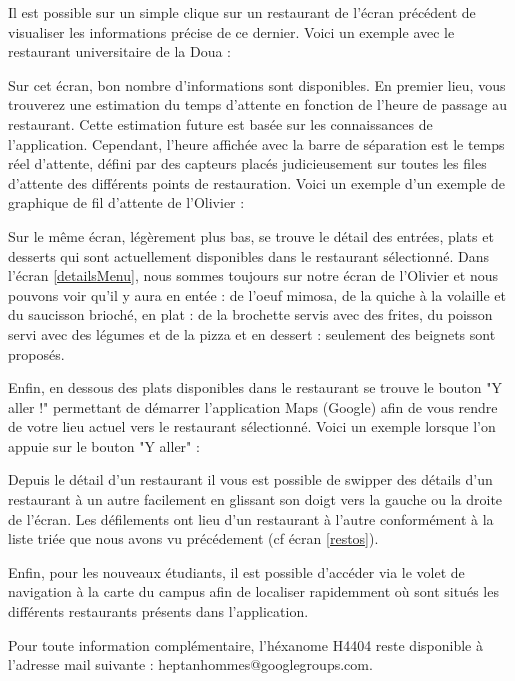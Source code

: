 Il est possible sur un simple clique sur un restaurant de l’écran précédent de
visualiser les informations précise de ce dernier. Voici un exemple avec le
restaurant universitaire de la Doua : 

Sur cet écran, bon nombre d’informations sont disponibles. En premier lieu,
vous trouverez une estimation du temps d’attente en fonction de l’heure de
passage au restaurant. Cette estimation future est basée sur les connaissances
de l’application. Cependant, l’heure affichée avec la barre de séparation est le
temps réel d’attente, défini par des capteurs placés judicieusement sur toutes
les files d’attente des différents points de restauration. Voici un exemple d'un
exemple de graphique de fil d'attente de l'Olivier :

Sur le même écran, légèrement plus bas, se trouve le détail des entrées,
plats et desserts qui sont actuellement disponibles dans le restaurant
sélectionné. Dans l’écran \ref{detailsMenu}, nous sommes toujours sur
notre écran de l'Olivier et nous pouvons voir qu’il y aura en entée : 
de l'oeuf mimosa, de la quiche à la volaille et du saucisson brioché, en plat : 
de la brochette servis avec des frites, du poisson servi avec des légumes et de 
la pizza et en dessert : seulement des beignets sont proposés.  

Enfin, en dessous des plats disponibles dans le restaurant se trouve le
bouton "Y aller !" permettant de démarrer l’application Maps (Google) afin de
vous rendre de votre lieu actuel vers le restaurant sélectionné. Voici un exemple
lorsque l'on appuie sur le bouton "Y aller" :

Depuis le détail d’un restaurant il vous est possible de swipper des 
détails d’un restaurant à un autre facilement en glissant son doigt vers la
gauche ou la droite de l’écran. Les défilements ont lieu d'un restaurant à l'autre
conformément à la liste triée que nous avons vu précédement (cf écran \ref{restos}).

Enfin, pour les nouveaux étudiants, il est possible d'accéder via le volet de navigation
à la carte du campus afin de localiser rapidemment où sont situés les différents
restaurants présents dans l'application.

Pour toute information complémentaire, l’héxanome H4404 reste disponible
à l’adresse mail suivante : heptanhommes@googlegroups.com. 
